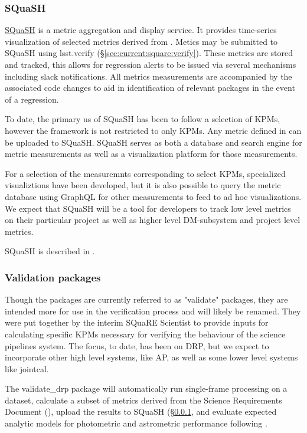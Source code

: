 \documentclass[DM,authoryear,toc,lsstdraft]{lsstdoc}
\begin{document}
\subsubsection{SQuaSH}
\label{sec:current:square:squash}

\href{https://squash.lsst.codes}{SQuaSH} is a \gls{metric} aggregation and
display service. It provides time-series visualization of selected metrics
derived from . Metics may be submitted to SQuaSH using
lsst.verify (\S\ref{sec:current:square:verify}). These metrics are stored and
tracked, this allows for regression alerts to be issued via several mechanisms
including slack notifications.  All metrics measurements are accompanied by
the associated code changes to aid in identification of relevant packages in
the event of a regression.

To date, the primary us of SQuaSH has been to follow a selection of KPMs,
however the framework is not restricted to only KPMs. Any metric defined in
 can be uploaded to SQuaSH. SQuaSH serves as both a
database and search engine for metric measurements as well as a visualization
platform for those measurements.

For a selection of the measuremnts corresponding to select KPMs, specialized
visualiztions have been developed, but it is also possible to query the metric
database using GraphQL for other measurements to feed to ad hoc visualizations.
We expect that SQuaSH will be a tool for developers to track low level metrics
on their particular project as well as higher level DM-subsystem and project level
metrics.

SQuaSH is described in .

\subsubsection{Validation packages}
\label{sec:current:square:validate}

Though the packages are currently referred to as "validate" packages, they
are intended more for use in the verification process and will likely be renamed.
They were put together by the interim SQuaRE Scientist to provide inputs for
calculating specific KPMs necessary for verifying the behaviour of the
science pipelines system.  The focus, to date, has been on DRP, but we expect
to incorporate other high level systems, like AP, as well as some lower level
systems like jointcal.

The validate\_drp package will automatically run single-frame processing on a
dataset, calculate a subset of \glspl{metric} derived from the Science
Requirements Document (), upload the results to SQuaSH
(\S\ref{sec:current:square:squash}, and evaluate expected analytic models for
photometric and astrometric performance following \cite{2008arXiv0805.2366I}.
\end{document}
